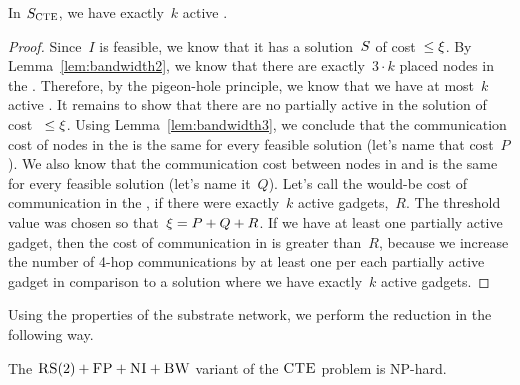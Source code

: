 \begin{lemma}
  In $S_{\mathrm{\textsc{CTE}}}$, we have exactly~$k$ active
  {\TripleGadgets}.
  \label{lem:full-or-empty}
\end{lemma}

\begin{proof}
  Since~$I$ is feasible, we know that it has a solution~$S$ of
  cost~$\leq \xi$.
  By Lemma~\ref{lem:bandwidth2}, we know that there are
  exactly~$3\cdot k$ placed nodes in the {\MatchSubtree}. Therefore, by
  the pigeon-hole principle, we know that we have at most~$k$
  active {\TripleGadgets}. It remains to show that there
  are no partially active {\TripleGadgets} in the solution of cost
 ~$\leq \xi$.
  Using Lemma~\ref{lem:bandwidth3}, 
  we conclude that the communication cost of
  nodes in the {\CoverSubtree} is the same for every feasible solution
  (let's name that cost~$P$). We also know that the communication cost
  between nodes in {\CoverSubtree} and {\MatchSubtree} is the same for
  every feasible solution (let's name it~$Q$). Let's call the
  would-be cost of communication in the {\MatchSubtree}, if there were
  exactly~$k$ active gadgets,~$R$.
  The threshold value was chosen so that~$\xi = P+Q+R$. If we have at least one partially active
  gadget, then the cost of communication in {\MatchSubtree} is greater
  than~$R$, because we increase the number of 4-hop communications by
  at least one per each partially active gadget in comparison to a solution
  where we have exactly~$k$ active gadgets.
\end{proof}

Using the properties of the substrate network, we perform the reduction in the following way.

\begin{theorem}
 The $\textsc{RS}(2)+\textsc{FP}+\textsc{NI}+\textsc{BW}$ variant of the $\textsc{CTE}$ problem is NP-hard.
\end{theorem}

